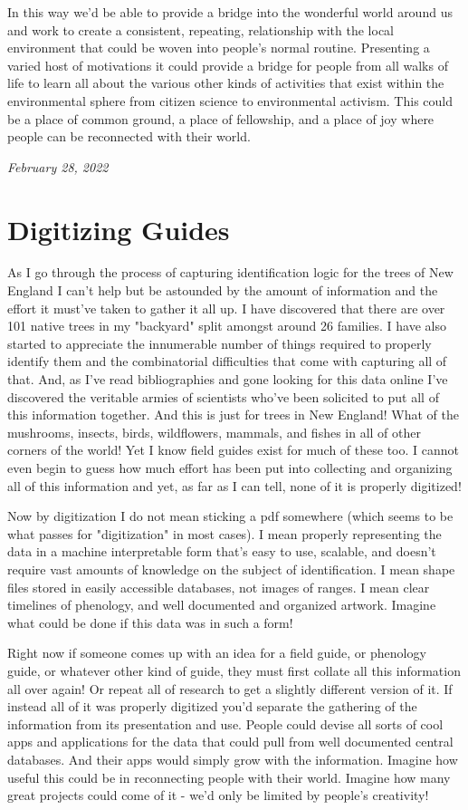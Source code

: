 \documentclass[10pt,a5paper]{book}
\begin{document}
In this way we'd be able to provide a bridge into the wonderful world around us and work to create a consistent, repeating, relationship with the local environment that could be woven into people's normal routine. Presenting a varied host of motivations it could provide a bridge for people from all walks of life to learn all about the various other kinds of activities that exist within the environmental sphere from citizen science to environmental activism. This could be a place of common ground, a place of fellowship, and a place of joy where people can be reconnected with their world. 

\textit{February 28, 2022}

\section{Digitizing Guides}
As I go through the process of capturing identification logic for the trees of New England I can't help but be astounded by the amount of information and the effort it must've taken to gather it all up. I have discovered that there are over 101 native trees in my "backyard" split amongst around 26 families. I have also started to appreciate the innumerable number of things required to properly identify them and the combinatorial difficulties that come with capturing all of that. And, as I've read bibliographies and gone looking for this data online I've discovered the veritable armies of scientists who've been solicited to put all of this information together. And this is just for trees in New England! What of the mushrooms, insects, birds, wildflowers, mammals, and fishes in all of other corners of the world! Yet I know field guides exist for much of these too. I cannot even begin to guess how much effort has been put into collecting and organizing all of this information and yet, as far as I can tell, none of it is properly digitized!

Now by digitization I do not mean sticking a pdf somewhere (which seems to be what passes for "digitization" in most cases). I mean properly representing the data in a machine interpretable form that's easy to use, scalable, and doesn't require vast amounts of knowledge on the subject of identification. I mean shape files stored in easily accessible databases, not images of ranges. I mean clear timelines of phenology, and well documented and organized artwork. Imagine what could be done if this data was in such a form! 

Right now if someone comes up with an idea for a field guide, or phenology guide, or whatever other kind of guide, they must first collate all this information all over again! Or repeat all of research to get a slightly different version of it. If instead all of it was properly digitized you'd separate the gathering of the information from its presentation and use. People could devise all sorts of cool apps and applications for the data that could pull from well documented central databases. And their apps would simply grow with the information. Imagine how useful this could be in reconnecting people with their world. Imagine how many great projects could come of it - we'd only be limited by people's creativity!
\end{document}
